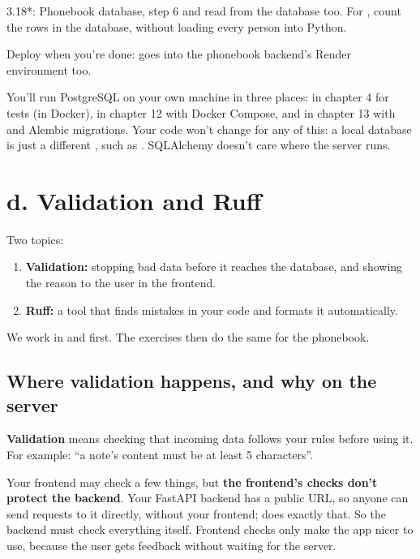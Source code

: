 \begin{exercise}{3.18*: Phonebook database, step 6}
 and  read from the database too. For , count the rows in the database, without loading every person into Python.

Deploy when you're done:  goes into the phonebook backend's Render environment too.
\end{exercise}

\begin{note}
You'll run PostgreSQL on your own machine in three places: in chapter 4 for tests (in Docker), in chapter 12 with Docker Compose, and in chapter 13 with  and Alembic migrations. Your code won't change for any of this: a local database is just a different , such as . SQLAlchemy doesn't care where the server runs.
\end{note}

\section{d. Validation and Ruff}

Two topics:
\begin{enumerate}
\item \textbf{Validation:} stopping bad data before it reaches the database, and showing the reason to the user in the frontend.
\item \textbf{Ruff:} a tool that finds mistakes in your code and formats it automatically.
\end{enumerate}

We work in  and  first. The exercises then do the same for the phonebook.

\subsection{Where validation happens, and why on the server}

\textbf{Validation} means checking that incoming data follows your rules before using it. For example: ``a note's content must be at least 5 characters''.

Your frontend may check a few things, but \textbf{the frontend's checks don't protect the backend}. Your FastAPI backend has a public URL, so anyone can send requests to it directly, without your frontend;  does exactly that. So the backend must check everything itself. Frontend checks only make the app nicer to use, because the user gets feedback without waiting for the server.


